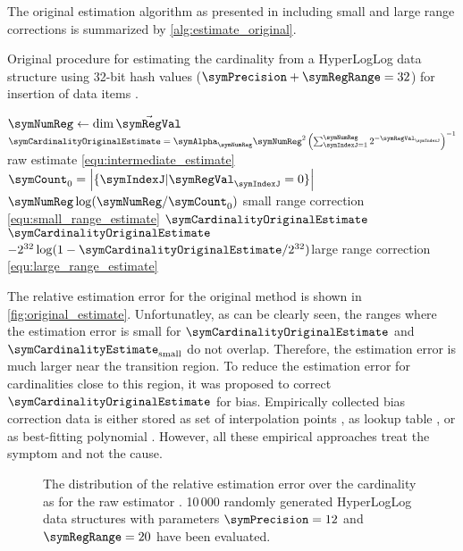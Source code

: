 \documentclass[a4paper]{scrartcl}
\begin{document}
The original estimation algorithm as presented in \cite{Flajolet2007} including small and large range corrections is summarized by \cref{alg:estimate_original}. 
\begin{algorithm}
\caption{Original procedure for estimating the cardinality from a  HyperLogLog data structure using 32-bit hash values ($\symPrecision+\symRegRange = 32$) for insertion of data items \cite{Flajolet2007}.}
\label{alg:estimate_original}
\begin{algorithmic}
\State $\symNumReg \gets \dim \vec{\symRegVal}$
\State $\symCardinalityOriginalEstimate = \symAlpha_\symNumReg \symNumReg^2\left(\sum_{\symIndexJ=1}^\symNumReg 2^{-\symRegVal_\symIndexJ}\right)^{-1}$
\Comment raw estimate \eqref{equ:intermediate_estimate}
\State $\symCount_0 = \left|\{\symIndexJ |\symRegVal_\symIndexJ=0\}\right|$
\State \Return $\symNumReg \log(\symNumReg / \symCount_0)$ \Comment small range correction \eqref{equ:small_range_estimate}
\Else
\State \Return $\symCardinalityOriginalEstimate$
\EndIf
{}
\State \Return $\symCardinalityOriginalEstimate$
\Else
\State\Return $-2^{32}\log(1-\symCardinalityOriginalEstimate/2^{32})$\Comment large range correction \eqref{equ:large_range_estimate}
\EndIf
\EndFunction
\end{algorithmic}
\end{algorithm}
The relative estimation error for the original method is shown in \cref{fig:original_estimate}. Unfortunatley, as can be clearly seen, the ranges where the estimation error is small for $\symCardinalityOriginalEstimate$ and $\symCardinalityEstimate_\text{small}$ do not overlap. Therefore, the estimation error is much larger near the transition region. To reduce the estimation error for cardinalities close to this region, it was proposed to correct $\symCardinalityOriginalEstimate$ for bias. Empirically collected bias correction data is either stored as set of interpolation points \cite{Heule2013}, as lookup table \cite{Rhodes2015}, or as best-fitting polynomial \cite{Sanfilippo2014}. However, all these empirical approaches treat the symptom and not the cause.

\begin{figure}
\centering

\caption{The distribution of the relative estimation error over the cardinality as for the raw estimator \cite{Flajolet2007}. 10\,000 randomly generated HyperLogLog data structures with parameters $\symPrecision = 12$ and $\symRegRange=20$ have been evaluated.}
\label{fig:raw_estimate}
\end{figure}
\end{document}
